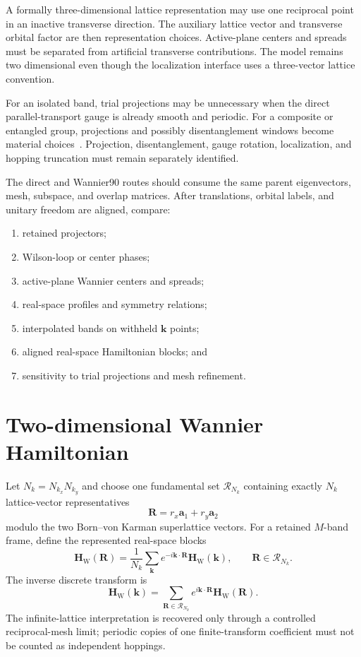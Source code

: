 A formally three-dimensional lattice representation may use one reciprocal
point in an inactive transverse direction. The auxiliary lattice vector and
transverse orbital factor are then representation choices. Active-plane centers
and spreads must be separated from artificial transverse contributions. The
model remains two dimensional even though the localization interface uses a
three-vector lattice convention.

For an isolated band, trial projections may be unnecessary when the direct
parallel-transport gauge is already smooth and periodic. For a composite or
entangled group, projections and possibly disentanglement windows become
material choices~\cite{souza2001}. Projection, disentanglement, gauge rotation,
localization, and hopping truncation must remain separately identified.

The direct and Wannier90 routes should consume the same parent eigenvectors,
mesh, subspace, and overlap matrices. After translations, orbital labels, and
unitary freedom are aligned, compare:
\begin{enumerate}
    \item retained projectors;
    \item Wilson-loop or center phases;
    \item active-plane Wannier centers and spreads;
    \item real-space profiles and symmetry relations;
    \item interpolated bands on withheld $\mathbf k$ points;
    \item aligned real-space Hamiltonian blocks; and
    \item sensitivity to trial projections and mesh refinement.
\end{enumerate}

\section*{Two-dimensional Wannier Hamiltonian}

Let $N_k=N_{k_x}N_{k_y}$ and choose one fundamental set
$\mathcal R_{N_k}$ containing exactly $N_k$ lattice-vector representatives
\begin{equation}
    \mathbf R=r_x\mathbf a_1+r_y\mathbf a_2
\end{equation}
modulo the two Born--von Karman superlattice vectors. For a retained $M$-band
frame, define the represented real-space blocks
\begin{equation}
    \mathbf H_{\mathrm W}(\mathbf R)
    =
    \frac{1}{N_k}
    \sum_{\mathbf k}
    e^{-i\mathbf k\cdot\mathbf R}
    \mathbf H_{\mathrm W}(\mathbf k),
    \qquad
    \mathbf R\in\mathcal R_{N_k}.
\end{equation}
The inverse discrete transform is
\begin{equation}
    \mathbf H_{\mathrm W}(\mathbf k)
    =
    \sum_{\mathbf R\in\mathcal R_{N_k}}
    e^{i\mathbf k\cdot\mathbf R}
    \mathbf H_{\mathrm W}(\mathbf R).
\end{equation}
The infinite-lattice interpretation is recovered only through a controlled
reciprocal-mesh limit; periodic copies of one finite-transform coefficient must
not be counted as independent hoppings.

